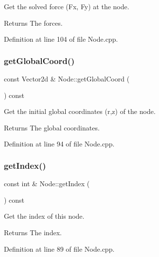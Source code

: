 Get the solved force (Fx, Fy) at the node. 

\begin{DoxyReturn}{Returns}
The forces. 
\end{DoxyReturn}


Definition at line 104 of file Node.\+cpp.

\mbox{\label{class_node_ab0129116eb1cff646bd53b8120cd34e6}} 
\subsubsection{\texorpdfstring{get\+Global\+Coord()}{getGlobalCoord()}}
{\footnotesize\ttfamily const Vector2d \& Node\+::get\+Global\+Coord (\begin{DoxyParamCaption}{ }\end{DoxyParamCaption}) const}



Get the initial global coordinates (r,z) of the node. 

\begin{DoxyReturn}{Returns}
The global coordinates. 
\end{DoxyReturn}


Definition at line 94 of file Node.\+cpp.

\mbox{\label{class_node_a8266479b3d82c502d7b4abc5afccb8c0}} 
\subsubsection{\texorpdfstring{get\+Index()}{getIndex()}}
{\footnotesize\ttfamily const int \& Node\+::get\+Index (\begin{DoxyParamCaption}{ }\end{DoxyParamCaption}) const}



Get the index of this node. 

\begin{DoxyReturn}{Returns}
The index. 
\end{DoxyReturn}


Definition at line 89 of file Node.\+cpp.

\mbox{\label{class_node_a9703bb2540dbc410edd3a168a6c51cd6}} 
